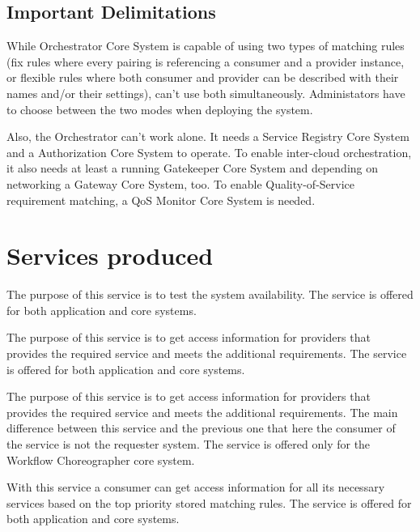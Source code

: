 \documentclass[a4paper]{arrowhead}
\begin{document}
\subsection{Important Delimitations}
\label{sec:delimitations}

While Orchestrator Core System is capable of using two types of matching rules (fix rules where every pairing is referencing a consumer and a provider instance, or flexible rules where both consumer and provider can be described with their names and/or their settings), can't use both simultaneously. Administators have to choose between the two modes when deploying the system.

Also, the Orchestrator can't work alone. It needs a Service Registry Core System and a Authorization Core System to operate. To enable inter-cloud orchestration, it also needs at least a running Gatekeeper Core System and depending on networking a Gateway Core System, too. To enable Quality-of-Service requirement matching, a QoS Monitor Core System is needed.

\newpage

\section{Services produced}
\label{sec:services}

The purpose of this service is to test the system availability. The service is offered for both application and core systems. 

The purpose of this service is to get access information for providers that provides the required service and meets the additional requirements. The service is offered for both application and core systems. 

The purpose of this service is to get access information for providers that provides the required service and meets the additional requirements. The main difference between this service and the previous one that here the consumer of the service is not the requester system. The service is offered only for the Workflow Choreographer core system. 

With this service a consumer can get access information for all its necessary services based on the top priority stored matching rules. The service is offered for both application and core systems.
\end{document}
